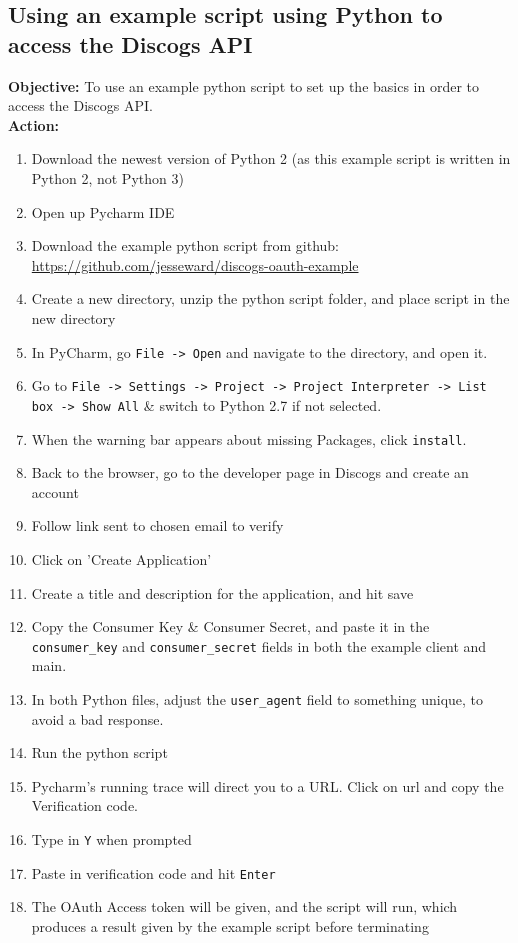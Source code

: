\documentclass{article}
\begin{document}
\subsection{Using an example script using Python to access the Discogs API}
\textbf{Objective:} To use an example python script to set up the basics in order to access the Discogs API.\\
\textbf{Action:}
\begin{enumerate}
    \item Download the newest version of Python 2 (as this example script is written in Python 2, not Python 3)
    \item Open up Pycharm IDE
    \item Download the example python script from github:\\
    \url{https://github.com/jesseward/discogs-oauth-example}
    \item Create a new directory, unzip the python script folder, and place script in the new directory
    \item In PyCharm, go \texttt{File -> Open} and navigate to the directory, and open it.
    \item Go to \texttt{File -> Settings -> Project -> Project Interpreter -> List box -> Show All} \& switch to Python 2.7 if not selected.
    \item When the warning bar appears about missing Packages, click \texttt{install}.
    \item Back to the browser, go to the developer page in Discogs and create an account
    \item Follow link sent to chosen email to verify
    \item Click on 'Create Application'
    \item Create a title and description for the application, and hit save
    \item Copy the Consumer Key \& Consumer Secret, and paste it in the \verb|consumer_key| and \verb|consumer_secret| fields in both the example client and main.
    \item In both Python files, adjust the \verb|user_agent| field to something unique, to avoid a bad response.
    \item Run the python script
    \item Pycharm's running trace will direct you to a URL. Click on url and copy the Verification code.
    \item Type in \texttt{Y} when prompted
    \item Paste in verification code and hit \texttt{Enter}
    \item The OAuth Access token will be given, and the script will run, which produces a result given by the example script before terminating
\end{enumerate}
\end{document}

